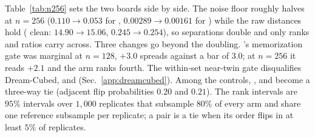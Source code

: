 Table~\ref{tab:n256} sets the two boards side by side. The noise floor roughly halves at
$n{=}256$ ($0.110\to0.053$ for \vkid{}, $0.00289\to0.00161$ for \mvkid{}) while the raw
distances hold (\voxar{} clean: \vkid{} $14.90\to15.06$, \mvkid{} $0.245\to0.254$), so
separations double and only ranks and ratios carry across. Three changes go beyond the
doubling. \voxarun{}'s memorization gate was marginal at $n{=}128$, $+3.0$ spreads against
a bar of $3.0$; at $n{=}256$ it reads $+2.1$ and the arm ranks fourth. The within-set
near-twin gate disqualifies Dream-Cubed, \gabled{} and \hollowbox{}
(Sec.~\ref{app:dreamcubed}). Among the controls, \matshuffle{}, \patchstitch{} and
\solidify{} become a three-way tie (adjacent flip probabilities $0.20$ and $0.21$). The rank intervals are $95\%$ intervals over
$1{,}000$ replicates that subsample $80\%$ of every arm and share one reference subsample
per replicate; a pair is a tie when its order flips in at least $5\%$ of replicates.
